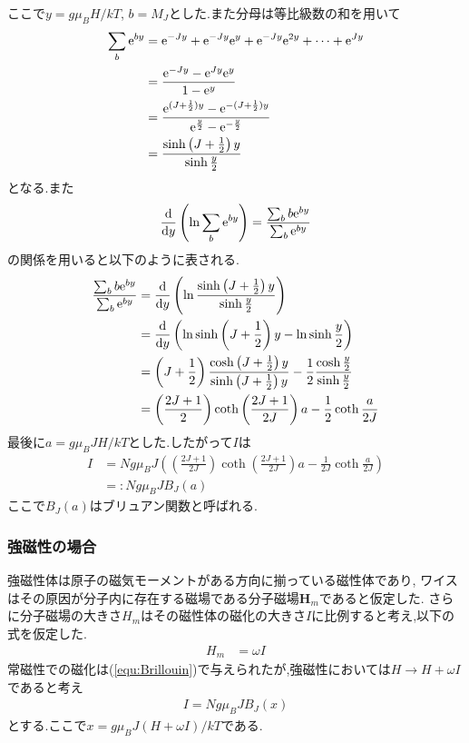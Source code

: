 ここで$y=g\mu_BH/kT$, $b=M_J$とした.また分母は等比級数の和を用いて
\begin{align}
  \sum_{b}{\rm e}^{by}&={\rm e}^{-Jy}+{\rm e}^{-Jy}{\rm e}^{y}+{\rm e}^{-Jy}{\rm e}^{2y}+\cdots+{\rm e}^{Jy}\nonumber\\
  &=\frac{{\rm e}^{-Jy}-{\rm e}^{Jy}{\rm e}^y}{1-{\rm e}^y}\nonumber\\
  &=\frac{{\rm e}^{(J+\frac{1}{2})y}-{\rm e}^{-(J+\frac{1}{2})y}}{{\rm e}^{\frac{y}{2}}-{\rm e}^{-\frac{y}{2}}}\nonumber\\
  &=\frac{\sinh\left(J+\frac{1}{2}\right)y}{\sinh\frac{y}{2}}
\end{align}
となる.また
\begin{align}
  \frac{\rm d}{{\rm d}y}\left(\ln\sum_b{\rm e}^{by}\right)=\frac{\sum_bb{\rm e}^{by}}{\sum_b{\rm e}^{by}}
\end{align}
の関係を用いると以下のように表される.
\begin{align}
  \frac{\sum_bb{\rm e}^{by}}{\sum_b{\rm e}^{by}}&=\frac{\rm d}{{\rm d}y}\left(\ln\frac{\sinh\left(J+\frac{1}{2}\right)y}{\sinh\frac{y}{2}}\right)\nonumber\\
  &=\frac{\rm d}{{\rm d}y}\left(\ln\sinh\left(J+\frac{1}{2}\right)y-\ln\sinh\frac{y}{2}\right)\nonumber\\
  &=\left(J+\frac{1}{2}\right)\frac{\cosh\left(J+\frac{1}{2}\right)y}{\sinh\left(J+\frac{1}{2}\right)y}-\frac{1}{2}\frac{\cosh\frac{y}{2}}{\sinh\frac{y}{2}}\nonumber\\
  &=\left(\frac{2J+1}{2}\right)\coth\left(\frac{2J+1}{2J}\right)a-\frac{1}{2}\coth\frac{a}{2J}
\end{align}
最後に$a=g\mu_BJH/kT$とした.したがって$I$は
\begin{align}
  \label{equ:Brillouin}
  I&=Ng\mu_BJ\left(\left(\frac{2J+1}{2J}\right)\coth\left(\frac{2J+1}{2J}\right)a-\frac{1}{2J}\coth\frac{a}{2J}\right)\nonumber\\
  &=:Ng\mu_BJB_J(a)
\end{align}
ここで$B_J(a)$はブリュアン関数と呼ばれる.
\subsubsection{強磁性の場合}
強磁性体は原子の磁気モーメントがある方向に揃っている磁性体であり,
ワイスはその原因が分子内に存在する磁場である分子磁場$\bm{H}_m$であると仮定した.
さらに分子磁場の大きさ$H_m$はその磁性体の磁化の大きさ$I$に比例すると考え,以下の式を仮定した.
\begin{align}
  H_m&=\omega I
\end{align}
常磁性での磁化は(\ref{equ:Brillouin})で与えられたが,強磁性においては$H\rightarrow H+\omega I$であると考え
\begin{align}
  \label{equ:I_strong}
  I=Ng\mu_BJB_J(x)
\end{align}
とする.ここで$x=g\mu_BJ(H+\omega I)/kT$である.

